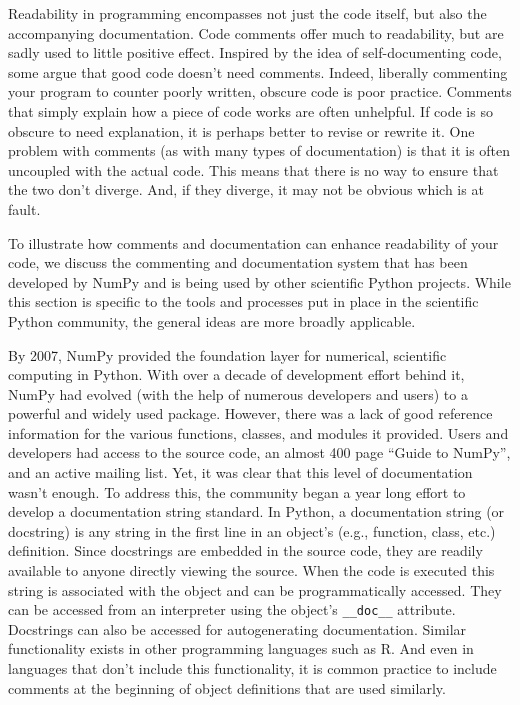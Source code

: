 \documentclass[ChapterTOCs,krantz2]{krantz} %
\begin{document}
Readability in programming encompasses not just the code itself, but also the
accompanying documentation. Code comments offer much to readability, but are
sadly used to little positive effect. Inspired by the idea of self-documenting
code, some argue that good code doesn't need comments. Indeed, liberally
commenting your program to counter poorly written, obscure code is poor
practice. Comments that simply explain how a piece of code works are often
unhelpful. If code is so obscure to need explanation, it is perhaps better to
revise or rewrite it. One problem with comments (as with many types of
documentation) is that it is often uncoupled with the actual code. This means
that there is no way to ensure that the two don't diverge.  And, if they
diverge, it may not be obvious which is at fault.

To illustrate how comments and documentation can enhance readability of your
code, we discuss the commenting and documentation system that has been
developed by NumPy and is being used by other scientific Python projects. While
this section is specific to the tools and processes put in place in the
scientific Python community, the general ideas are more broadly applicable.

By 2007, NumPy provided the foundation layer for numerical, scientific
computing in Python. With over a decade of development effort behind it, NumPy
had evolved (with the help of numerous developers and users) to a powerful and
widely used package. However, there was a lack of good reference information
for the various functions, classes, and modules it provided. Users and
developers had access to the source code, an almost 400 page ``Guide to
NumPy'', and an active mailing list. Yet, it was clear that this level of
documentation wasn't enough. To address this, the community began a year long
effort to develop a documentation string standard. In Python, a documentation
string (or docstring) is any string in the first line in an object's (e.g.,
function, class, etc.) definition. Since docstrings are embedded in the source
code, they are readily available to anyone directly viewing the source. When
the code is executed this string is associated with the object and can be
programmatically accessed.  They can be accessed from an interpreter using the
object's \texttt{\_\_doc\_\_} attribute.  Docstrings can also be accessed for
autogenerating documentation.  Similar functionality exists in other
programming languages such as R. And even in languages that don't include this
functionality, it is common practice to include comments at the beginning of
object definitions that are used similarly.
\end{document}
